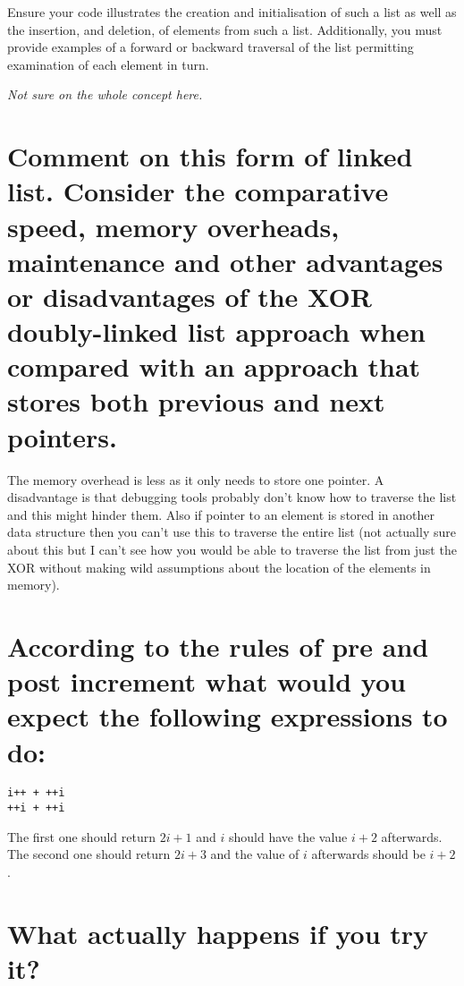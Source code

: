 \documentclass{supervision}
\begin{document}
\begin{questions}
\begin{parts}
{Ensure your code illustrates the creation and initialisation of such a list as well as the insertion, and deletion, of elements from such a list. Additionally, you must provide examples of a forward or backward traversal of the list permitting examination of each element in turn.}
        \begin{solution}
        \textit{Not sure on the whole concept here.}
        \end{solution}

        \part[5]{Comment on this form of linked list. Consider the comparative speed, memory overheads, maintenance and other advantages or disadvantages of the XOR doubly-linked list approach when compared with an approach that stores both previous and next pointers.}
        \begin{solution}
        The memory overhead is less as it only needs to store one pointer. A disadvantage is that debugging tools probably don't know how to traverse the list and this might hinder them. Also if pointer to an element is stored in another data structure then you can't use this to traverse the entire list (not actually sure about this but I can't see how you would be able to traverse the list from just the XOR without making wild assumptions about the location of the elements in memory).
        \end{solution}

    \end{parts}
    \question{}
    \begin{parts}

        \part{According to the rules of pre and post increment what would you expect the following expressions to do:}
\begin{lstlisting}
i++ + ++i
++i + ++i
\end{lstlisting}
    \begin{solution}
        The first one should return $2i+1$ and $i$ should have the value $i+2$ afterwards. \\
        The second one should return $2i+3$ and the value of $i$ afterwards should be $i+2$.
    \end{solution}


        \part{What actually happens if you try it?}
        \begin{solution}
        
        \end{solution}

    \end{parts}

\end{questions}
\end{document}
